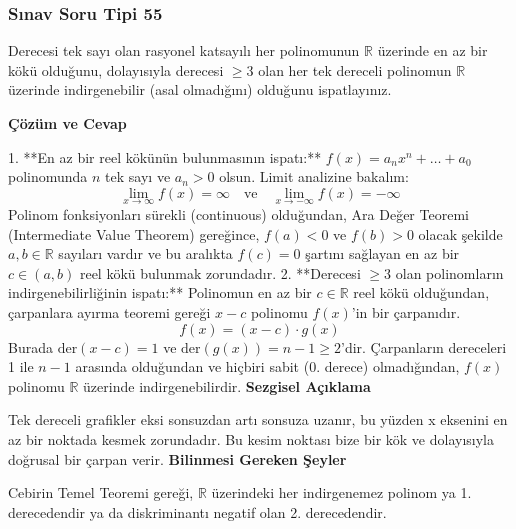 \documentclass[11pt, a4paper]{article}
\newenvironment{cozum}{
    \vspace{0.5cm}
    \noindent\textcolor{green!60!black}{\faCheckCircle\enspace \textbf{\Large Çözüm ve Cevap}}\par\vspace{0.2cm}
}{}
\newenvironment{sezgisel}{
    \vspace{0.5cm}
    \noindent\textcolor{orange!80!black}{\faLightbulb\enspace \textbf{\Large Sezgisel Açıklama}}\par\vspace{0.2cm}
    \itshape
}{}
\newenvironment{bilgi}{
    \vspace{0.5cm}
    \noindent\textcolor{red!70!black}{\faExclamationTriangle\enspace \textbf{\Large Bilinmesi Gereken Şeyler}}\par\vspace{0.2cm}
}{}
\begin{document}
\subsubsection{Sınav Soru Tipi 55}
\begin{sinavbox}
Derecesi tek sayı olan rasyonel katsayılı her polinomunun $\mathbb{R}$ üzerinde en az bir kökü olduğunu, dolayısıyla derecesi $\ge 3$ olan her tek dereceli polinomun $\mathbb{R}$ üzerinde indirgenebilir (asal olmadığını) olduğunu ispatlayınız.
\end{sinavbox}
\begin{cozum}
1. **En az bir reel kökünün bulunmasının ispatı:**
   $f(x) = a_n x^n + \dots + a_0$ polinomunda $n$ tek sayı ve $a_n > 0$ olsun.
   Limit analizine bakalım:
   \[ \lim_{x \to \infty} f(x) = \infty \quad \text{ve} \quad \lim_{x \to -\infty} f(x) = -\infty \]
   Polinom fonksiyonları sürekli (continuous) olduğundan, Ara Değer Teoremi (Intermediate Value Theorem) gereğince, $f(a) < 0$ ve $f(b) > 0$ olacak şekilde $a, b \in \mathbb{R}$ sayıları vardır ve bu aralıkta $f(c) = 0$ şartını sağlayan en az bir $c \in (a, b)$ reel kökü bulunmak zorundadır.
2. **Derecesi $\ge 3$ olan polinomların indirgenebilirliğinin ispatı:**
   Polinomun en az bir $c \in \mathbb{R}$ reel kökü olduğundan, çarpanlara ayırma teoremi gereği $x-c$ polinomu $f(x)$'in bir çarpanıdır.
   \[ f(x) = (x-c) \cdot g(x) \]
   Burada $\text{der}(x-c) = 1$ ve $\text{der}(g(x)) = n-1 \ge 2$'dir.
   Çarpanların dereceleri 1 ile $n-1$ arasında olduğundan ve hiçbiri sabit (0. derece) olmadığından, $f(x)$ polinomu $\mathbb{R}$ üzerinde indirgenebilirdir.
\end{cozum}
\begin{sezgisel}
Tek dereceli grafikler eksi sonsuzdan artı sonsuza uzanır, bu yüzden x eksenini en az bir noktada kesmek zorundadır. Bu kesim noktası bize bir kök ve dolayısıyla doğrusal bir çarpan verir.
\end{sezgisel}
\begin{bilgi}
Cebirin Temel Teoremi gereği, $\mathbb{R}$ üzerindeki her indirgenemez polinom ya 1. derecedendir ya da diskriminantı negatif olan 2. derecedendir.
\end{bilgi}

\newpage
\end{document}
